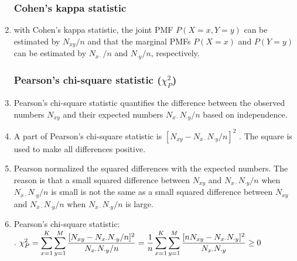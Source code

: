 \begin{enumerate}
\subsubsection{Cohen’s kappa statistic}

    \item with Cohen’s kappa statistic, the joint PMF $P(X = x, Y = y)$ can be estimated by $N_{x y} /n$ and that the marginal PMFs $P(X = x)$ and $P(Y = y)$ can be estimated by $N_{x\cdot }/n$ and $N_{\cdot y} /n$, respectively.
    \hfill \cite{statistics/book/Statistics-for-Data-Scientists/Maurits-Kaptein}

\subsubsection{Pearson’s chi-square statistic ($\chi_P^2$)}

    \item Pearson’s chi-square statistic quantifies the difference between the observed numbers $N_{x y}$ and their expected numbers $N_{x\cdot } N_{\cdot y} /n$ based on independence.
    \hfill \cite{statistics/book/Statistics-for-Data-Scientists/Maurits-Kaptein}

    \item  A part of Pearson’s chi-square statistic is $[N_{x y} - N_{x\cdot} N_{\cdot y} /n]^2$ . The square is used  to make all differences positive.
    \hfill \cite{statistics/book/Statistics-for-Data-Scientists/Maurits-Kaptein}

    \item Pearson normalized the squared differences with the expected numbers.
    The reason is that a small squared difference between $N_{x y}$ and $N_{x\cdot} N_{\cdot y} /n$ when $N_{x\cdot} N_{\cdot y} /n$ is small is not the same as a small squared difference between $N_{x y}$ and $N_{x\cdot} N_{\cdot y} /n$ when $N_{x\cdot} N_{\cdot y} /n$ is large.
    \hfill \cite{statistics/book/Statistics-for-Data-Scientists/Maurits-Kaptein}

    \item Pearson’s chi-square statistic:
    \hfill \cite{statistics/book/Statistics-for-Data-Scientists/Maurits-Kaptein}
    \\
    .\hfill
    $
        \chi^2_P
        = \displaystyle\sum^K_{x=1} \displaystyle\sum^M_ {y=1} \dfrac{[N_{x y} - N_{x\cdot} N_{\cdot y} /n]^2}{N_{x\cdot} N_{\cdot y} /n}
        = \dfrac{1}{n} \displaystyle\sum^K_{x=1} \displaystyle\sum^M_ {y=1} \dfrac{[n N_{x y} - N_{x\cdot} N_{\cdot y} ]^2} {N_{x\cdot} N_{\cdot y}}
        \geq 0
    $
    \hfill \cite{statistics/book/Statistics-for-Data-Scientists/Maurits-Kaptein}


\end{enumerate}
